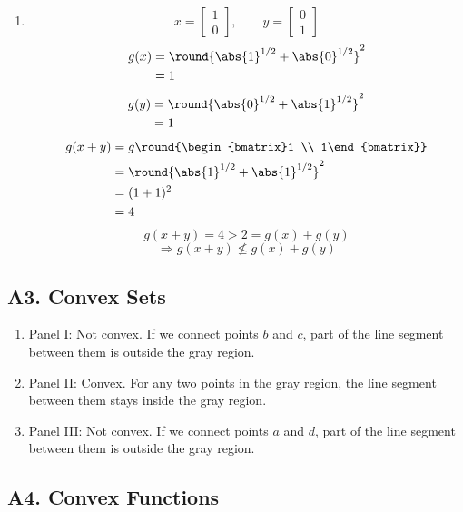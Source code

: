 \documentclass[fleqn]{article}
\begin{document}
\begin{enumerate}[label=(\alph*)]
\item
\[
x = \begin{bmatrix}1 \\ 0\end{bmatrix},
\qquad
y = \begin{bmatrix}0 \\ 1\end{bmatrix}
\]
\begin{align*}
g(x)
&= \round{\abs{1}^{1/2}+\abs{0}^{1/2}}^2 \\
&= 1
\end{align*}
\begin{align*}
g(y)
&= \round{\abs{0}^{1/2}+\abs{1}^{1/2}}^2 \\
&= 1
\end{align*}
\begin{align*}
g(x+y)
&= g\round{\begin{bmatrix}1 \\ 1\end{bmatrix}} \\
&= \round{\abs{1}^{1/2}+\abs{1}^{1/2}}^2 \\
&= (1+1)^2 \\
&= 4
\end{align*}
\[
g(x+y) = 4 > 2 = g(x)+g(y)
\]
\[
\Rightarrow g(x+y) \nleq g(x)+g(y)
\]
\end{enumerate}


\subsection*{A3. Convex Sets}

\begin{enumerate}[label=(\roman*)]
\item Panel I: Not convex. If we connect points $b$ and $c$, part of the line segment between them is outside the gray region.

\item Panel II: Convex. For any two points in the gray region, the line segment between them stays inside the gray region.

\item Panel III: Not convex. If we connect points $a$ and $d$, part of the line segment between them is outside the gray region.
\end{enumerate}


\subsection*{A4. Convex Functions}
\end{document}
